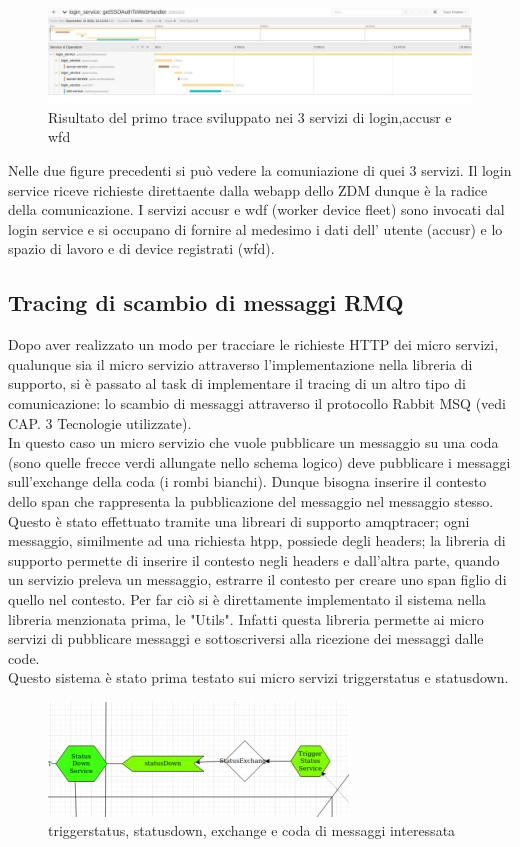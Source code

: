 \documentclass[a4paper,12pt,titlepage,italian,openany]{report}
\begin{document}
\begin{figure}[H]
    \includegraphics[scale = 0.4]{43.jpg}
    \centering
    \caption{Risultato del primo trace sviluppato nei 3 servizi di login,accusr e wfd}
\end{figure}
Nelle due figure precedenti si può vedere la comuniazione di quei 3 servizi. Il login service riceve richieste direttaente dalla webapp dello ZDM\cite{zdm:1} dunque è la radice della comunicazione. I servizi accusr e wdf (worker device fleet) sono invocati dal login service e si occupano di fornire al medesimo i dati dell' utente (accusr) e lo spazio di lavoro e di device registrati (wfd).
\subsection{Tracing di scambio di messaggi RMQ}
Dopo aver realizzato un modo per tracciare le richieste HTTP dei micro servizi, qualunque sia il micro servizio attraverso l'implementazione nella libreria di supporto, si è passato al task di implementare
il tracing di un altro tipo di comunicazione: lo scambio di messaggi attraverso il protocollo Rabbit MSQ (vedi CAP. 3 Tecnologie utilizzate).\\
In questo caso un micro servizio che vuole pubblicare un messaggio su una coda (sono quelle frecce verdi allungate nello schema logico) deve pubblicare i messaggi sull'exchange della coda (i rombi bianchi). Dunque bisogna  inserire il contesto dello span che rappresenta la pubblicazione del messaggio nel messaggio stesso. Questo è stato effettuato tramite una libreari di supporto amqptracer; ogni messaggio, similmente ad una richiesta htpp, possiede degli headers; la libreria di supporto permette di inserire il contesto negli headers e dall'altra parte, quando un servizio preleva un messaggio, estrarre il contesto per creare uno span figlio di quello nel contesto.
Per far ciò si è direttamente implementato il sistema nella libreria menzionata prima, le "Utils". Infatti questa libreria permette ai micro servizi di pubblicare messaggi e sottoscriversi alla ricezione dei messaggi dalle code.\\
Questo sistema è stato prima testato sui micro servizi triggerstatus e statusdown.
\begin{figure}[H]
    \includegraphics[]{44.png}
    \centering
    \caption{triggerstatus, statusdown, exchange e coda di messaggi interessata}
\end{figure} 
\end{document}
